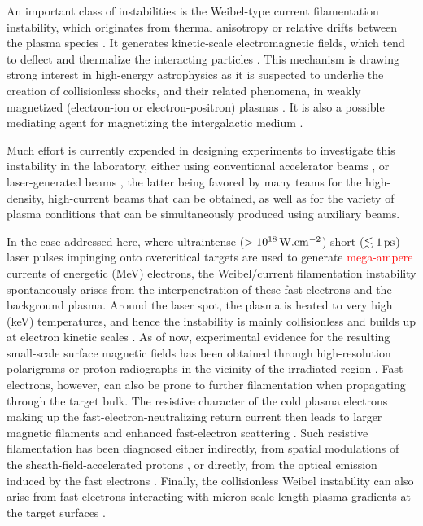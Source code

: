 \documentclass[aps,twocolumn,showpacs,superscriptaddress]{revtex4}
\begin{document}
An important class of instabilities is the Weibel-type current filamentation instability, which originates from thermal anisotropy \cite{PRL_Weibel_1959} or relative drifts between the plasma species \cite{POF_Fried_1959}. It generates kinetic-scale electromagnetic fields, which tend to deflect and thermalize the interacting particles \cite{POF_Davidson_1972, PRL_Lee_1973, PRL_Adam_2006}. This mechanism is drawing strong interest in high-energy astrophysics as it is suspected to underlie the creation of collisionless shocks, and their related phenomena, in weakly magnetized (electron-ion or electron-positron) plasmas \cite{RPP_Marcowith_2016}. It is also a possible mediating agent for magnetizing the intergalactic medium \cite{APJ_Schlickeiser_2003}.

Much effort is currently expended in designing experiments to investigate this instability in the laboratory, either using conventional accelerator beams \cite{PRL_Allen_2012}, or laser-generated beams \cite{PRL_Fox_2013,NP_Huntington_2015},
the latter being favored by many teams for the high-density, high-current beams that can be obtained, as well as for the variety of plasma conditions that can be simultaneously produced using auxiliary beams. 

In the case addressed here, where ultraintense ($>10^{18}\,\rm W.cm^{-2}$) short ($\lesssim 1\,\rm ps$) laser pulses impinging onto overcritical targets are used to generate \textcolor{red}{mega-ampere} currents of energetic (MeV) electrons, the Weibel/current filamentation instability spontaneously arises from the interpenetration of these fast electrons and the background plasma. Around the laser spot, the plasma is heated to very high (keV) temperatures, and hence the instability is mainly collisionless and builds up at electron kinetic scales \cite{PRL_Adam_2006}. As of now, experimental evidence for the resulting small-scale surface magnetic fields has been obtained through high-resolution polarigrams or proton radiographs in the vicinity of the irradiated region  \cite{PNAS_Mondal_2012, PRL_Romagnani_2019}.
Fast electrons, however, can also be prone to further filamentation when propagating through the target bulk. The resistive character of the cold plasma electrons making up the fast-electron-neutralizing return current \cite{POP_Gremillet_2002} then leads to larger magnetic filaments \cite{JPP_Fiore_2010} and enhanced fast-electron scattering \cite{POP_Yang_2016}. Such resistive filamentation has been diagnosed either indirectly, from spatial modulations of the sheath-field-accelerated protons \cite{PRL_Fuchs_2003, PRL_MacLellan_2013}, or directly, from the optical emission induced by the fast electrons  \cite{PRL_Storm_2009}. Finally, the collisionless Weibel instability can also arise from fast electrons interacting with micron-scale-length plasma gradients at the target surfaces \cite{PRE_Wei_2004, PRL_Quinn_2012, PRL_Gode_2017, NJP_Scott_2017}.
\end{document}
